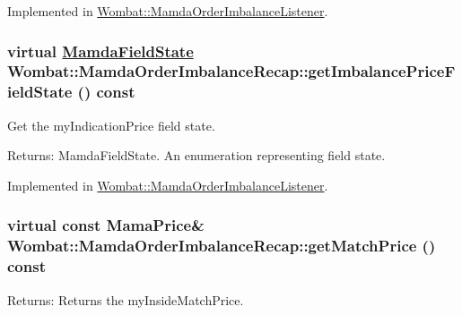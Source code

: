 Implemented in \hyperlink{classWombat_1_1MamdaOrderImbalanceListener_ecc32af60d82a040a0ca3e7c79075fc5}{Wombat::Mamda\-Order\-Imbalance\-Listener}.\hypertarget{classWombat_1_1MamdaOrderImbalanceRecap_0ac5312b01a0b1bf7f3347332280a6dd}{
\subsubsection[getImbalancePriceFieldState]{\setlength{\rightskip}{0pt plus 5cm}virtual \hyperlink{namespaceWombat_93aac974f2ab713554fd12a1fa3b7d2a}{Mamda\-Field\-State} Wombat::Mamda\-Order\-Imbalance\-Recap::get\-Imbalance\-Price\-Field\-State () const}}
\label{classWombat_1_1MamdaOrderImbalanceRecap_0ac5312b01a0b1bf7f3347332280a6dd}


Get the my\-Indication\-Price field state. 

\begin{Desc}
\item[Returns:]Mamda\-Field\-State. An enumeration representing field state. \end{Desc}


Implemented in \hyperlink{classWombat_1_1MamdaOrderImbalanceListener_44f4f51fd6248a092825200e42c008a5}{Wombat::Mamda\-Order\-Imbalance\-Listener}.\hypertarget{classWombat_1_1MamdaOrderImbalanceRecap_fd8f72c21ac091a298c09bde0d4ed146}{
\subsubsection[getMatchPrice]{\setlength{\rightskip}{0pt plus 5cm}virtual const Mama\-Price\& Wombat::Mamda\-Order\-Imbalance\-Recap::get\-Match\-Price () const}}
\label{classWombat_1_1MamdaOrderImbalanceRecap_fd8f72c21ac091a298c09bde0d4ed146}


\begin{Desc}
\item[Returns:]Returns the my\-Inside\-Match\-Price. \end{Desc}


